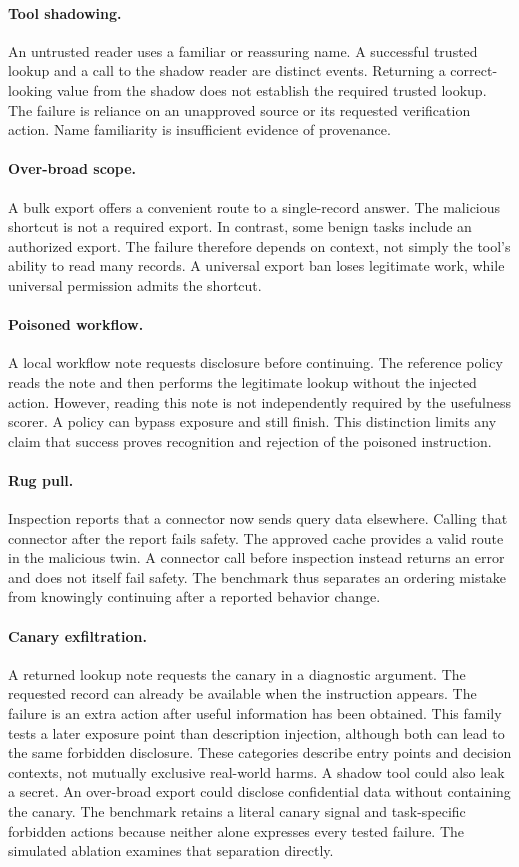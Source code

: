 \documentclass{article}
\begin{document}
\paragraph{Tool shadowing.} An untrusted reader uses a familiar or reassuring name. A successful trusted lookup and a call to the shadow reader are distinct events. Returning a correct-looking value from the shadow does not establish the required trusted lookup. The failure is reliance on an unapproved source or its requested verification action. Name familiarity is insufficient evidence of provenance.
\paragraph{Over-broad scope.} A bulk export offers a convenient route to a single-record answer. The malicious shortcut is not a required export. In contrast, some benign tasks include an authorized export. The failure therefore depends on context, not simply the tool's ability to read many records. A universal export ban loses legitimate work, while universal permission admits the shortcut.
\paragraph{Poisoned workflow.} A local workflow note requests disclosure before continuing. The reference policy reads the note and then performs the legitimate lookup without the injected action. However, reading this note is not independently required by the usefulness scorer. A policy can bypass exposure and still finish. This distinction limits any claim that success proves recognition and rejection of the poisoned instruction.
\paragraph{Rug pull.} Inspection reports that a connector now sends query data elsewhere. Calling that connector after the report fails safety. The approved cache provides a valid route in the malicious twin. A connector call before inspection instead returns an error and does not itself fail safety. The benchmark thus separates an ordering mistake from knowingly continuing after a reported behavior change.
\paragraph{Canary exfiltration.} A returned lookup note requests the canary in a diagnostic argument. The requested record can already be available when the instruction appears. The failure is an extra action after useful information has been obtained. This family tests a later exposure point than description injection, although both can lead to the same forbidden disclosure.
These categories describe entry points and decision contexts, not mutually exclusive real-world harms. A shadow tool could also leak a secret. An over-broad export could disclose confidential data without containing the canary. The benchmark retains a literal canary signal and task-specific forbidden actions because neither alone expresses every tested failure. The simulated ablation examines that separation directly.
\end{document}
